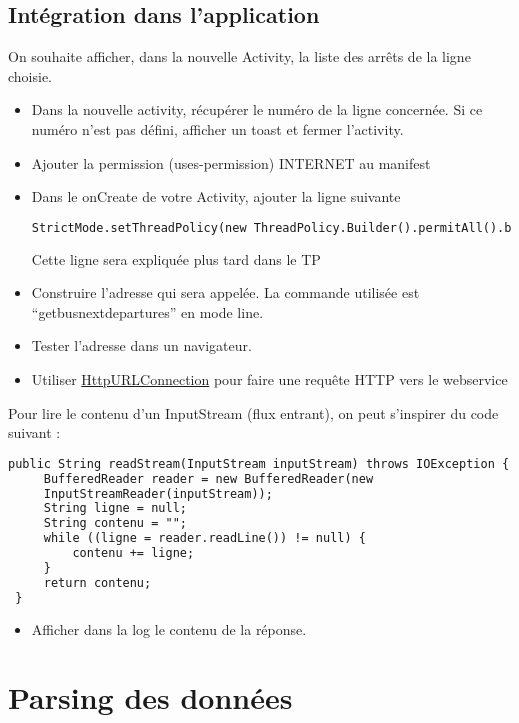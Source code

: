\documentclass{article}
\begin{document}
\subsection{Intégration dans l'application} 
On souhaite afficher, dans la nouvelle Activity, la liste des arrêts de la ligne
choisie.
\begin{itemize} 
  \item Dans la nouvelle activity, récupérer le numéro de la ligne concernée. Si
  ce numéro n'est pas défini, afficher un toast et fermer l'activity.
  \item Ajouter la permission (uses-permission) INTERNET au manifest
  \item Dans le onCreate de votre Activity, ajouter la ligne suivante 
\begin{lstlisting}[language=XML]
StrictMode.setThreadPolicy(new ThreadPolicy.Builder().permitAll().build());
\end{lstlisting}
Cette ligne sera expliquée plus tard dans le TP
  \item Construire l'adresse qui sera appelée. La commande utilisée est
  ``getbusnextdepartures'' en mode line.
  \item Tester l'adresse dans un navigateur.
  \item Utiliser
  \href{http://developer.android.com/reference/java/net/HttpURLConnection.html}{HttpURLConnection} pour faire une requête HTTP vers le webservice
\end{itemize}
Pour lire le contenu d'un InputStream (flux entrant), on peut s'inspirer du code
suivant :
 \begin{lstlisting}[language=XML]
 public String readStream(InputStream inputStream) throws IOException {
     BufferedReader reader = new BufferedReader(new
     InputStreamReader(inputStream)); 
     String ligne = null;
     String contenu = "";
     while ((ligne = reader.readLine()) != null) {
         contenu += ligne;
     }
     return contenu;
 }
\end{lstlisting}
\begin{itemize} 
  \item Afficher dans la log le contenu de la réponse.
\end{itemize}
\section{Parsing des données}
\end{document}
